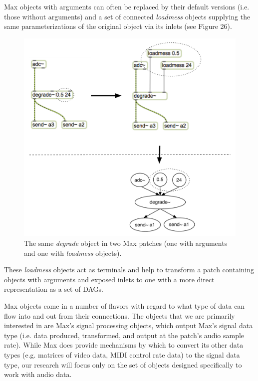 \documentclass[12pt]{report} 	%
\numberwithin{figure}{chapter}
\numberwithin{table}{chapter}
\numberwithin{equation}{chapter}
\begin{document}
\begin{flushleft}
Max objects with arguments can often be replaced by their default versions (i.e. those without arguments) and a set of connected \textit{loadmess} objects supplying the same parameterizations of the original object via its inlets (see Figure 26). 
\begin{figure}[h!]
\begin{center}
\includegraphics[scale=0.7]{MaxDAGsLoadmess}
\caption[Using \textit{loadmess} objects to provide parameters to Max]{The same \textit{degrade\texttildelow{}} object in two Max patches (one with arguments and one with \textit{loadmess} objects).}
\end{center}
\end{figure}
These \textit{loadmess} objects act as terminals and help to transform a patch containing objects with arguments and exposed inlets to one with a more direct representation as a set of DAGs.

Max objects come in a number of flavors with regard to what type of data can flow into and out from their connections. The objects that we are primarily interested in are Max's signal processing objects, which output Max's signal data type (i.e. data produced, transformed, and output at the patch's audio sample rate). While Max does provide mechanisms by which to convert its other data types (e.g. matrices of video data, MIDI control rate data) to the signal data type, our research will focus only on the set of objects designed specifically to work with audio data. 


\end{flushleft}
\end{document}
